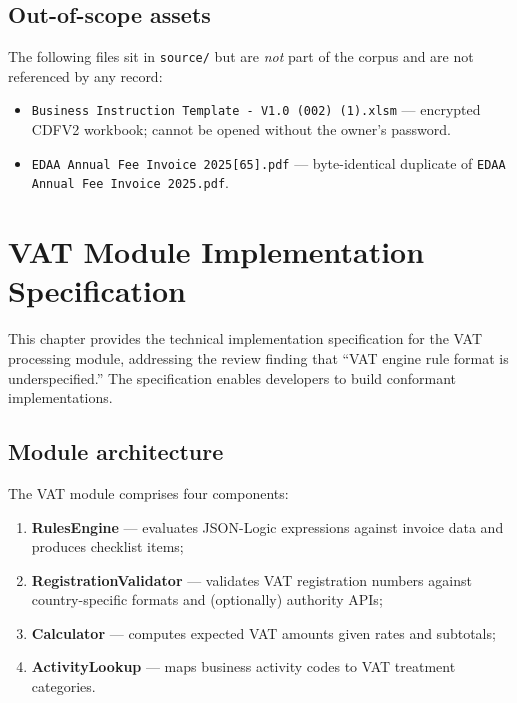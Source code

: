 \documentclass[11pt,a4paper,twoside]{report}
\newcommand{\corpus}{}
\begin{document}
\section{Out-of-scope assets}

The following files sit in
\corpus\texttt{source/} but are \emph{not} part of the corpus and
are not referenced by any record:

\begin{itemize}
\item \texttt{Business Instruction Template - V1.0 (002) (1).xlsm} ---
encrypted CDFV2 workbook; cannot be opened without the owner's
password.
\item \texttt{EDAA Annual Fee Invoice 2025[65].pdf} --- byte-identical
duplicate of \texttt{EDAA Annual Fee Invoice 2025.pdf}.
\end{itemize}
\chapter{VAT Module Implementation Specification}\label{ch:vat-impl}

This chapter provides the technical implementation specification for the VAT
processing module, addressing the review finding that ``VAT engine rule format
is underspecified.'' The specification enables developers to build conformant
implementations.

\section{Module architecture}

The VAT module comprises four components:

\begin{enumerate}
\item \textbf{RulesEngine} --- evaluates JSON-Logic expressions against invoice
data and produces checklist items;
\item \textbf{RegistrationValidator} --- validates VAT registration numbers
against country-specific formats and (optionally) authority APIs;
\item \textbf{Calculator} --- computes expected VAT amounts given rates and
subtotals;
\item \textbf{ActivityLookup} --- maps business activity codes to VAT
treatment categories.
\end{enumerate}
\end{document}
